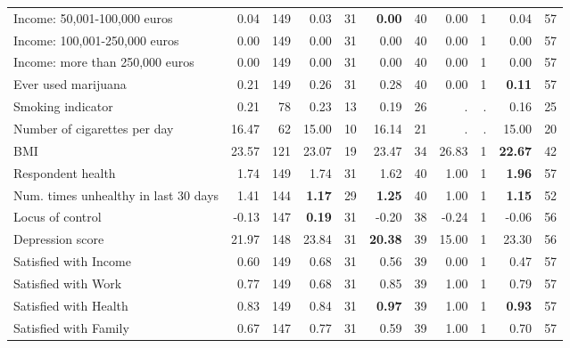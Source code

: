 \begin{tabular}{l r r r r r r r r r r}
Income: 50,001-100,000 euros &      0.04 &       149 &      0.03 &        31 & \textbf{     0.00} &        40 &      0.00 &         1 &      0.04 &        57 \\
Income: 100,001-250,000 euros &      0.00 &       149 &      0.00 &        31 &      0.00 &        40 &      0.00 &         1 &      0.00 &        57 \\
Income: more than 250,000 euros &      0.00 &       149 &      0.00 &        31 &      0.00 &        40 &      0.00 &         1 &      0.00 &        57 \\
Ever used marijuana &      0.21 &       149 &      0.26 &        31 &      0.28 &        40 &      0.00 &         1 & \textbf{     0.11} &        57 \\
Smoking indicator &      0.21 &        78 &      0.23 &        13 &      0.19 &        26 &         . & . &      0.16 &        25 \\
Number of cigarettes per day &     16.47 &        62 &     15.00 &        10 &     16.14 &        21 &         . & . &     15.00 &        20 \\
BMI &     23.57 &       121 &     23.07 &        19 &     23.47 &        34 &     26.83 &         1 & \textbf{    22.67} &        42 \\
Respondent health &      1.74 &       149 &      1.74 &        31 &      1.62 &        40 &      1.00 &         1 & \textbf{     1.96} &        57 \\
Num. times unhealthy in last 30 days &      1.41 &       144 & \textbf{     1.17} &        29 & \textbf{     1.25} &        40 &      1.00 &         1 & \textbf{     1.15} &        52 \\
Locus of control &     -0.13 &       147 & \textbf{     0.19} &        31 &     -0.20 &        38 &     -0.24 &         1 &     -0.06 &        56 \\
Depression score &     21.97 &       148 &     23.84 &        31 & \textbf{    20.38} &        39 &     15.00 &         1 &     23.30 &        56 \\
Satisfied with Income &      0.60 &       149 &      0.68 &        31 &      0.56 &        39 &      0.00 &         1 &      0.47 &        57 \\
Satisfied with Work &      0.77 &       149 &      0.68 &        31 &      0.85 &        39 &      1.00 &         1 &      0.79 &        57 \\
Satisfied with Health &      0.83 &       149 &      0.84 &        31 & \textbf{     0.97} &        39 &      1.00 &         1 & \textbf{     0.93} &        57 \\
Satisfied with Family &      0.67 &       147 &      0.77 &        31 &      0.59 &        39 &      1.00 &         1 &      0.70 &        57 \\
\bottomrule
\end{tabular}
